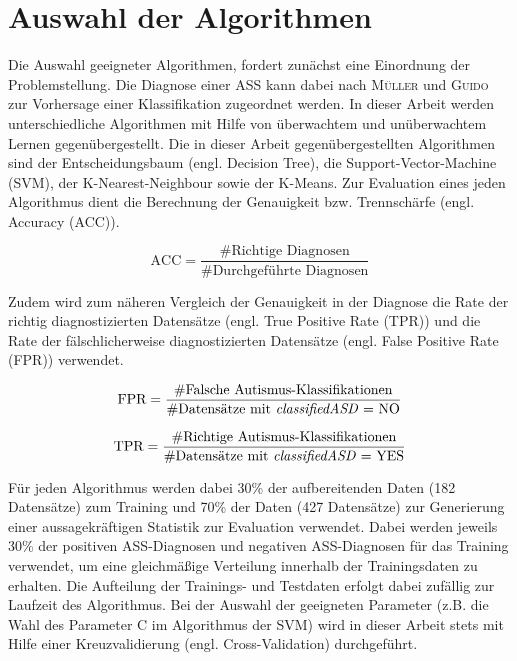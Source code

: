 \section{Auswahl der Algorithmen} \label{sec:algorithms}
Die Auswahl geeigneter Algorithmen, fordert zunächst eine Einordnung der Problemstellung. Die Diagnose einer ASS kann dabei nach \textsc{Müller} und \textsc{Guido} \cite[S.~94]{Muller2016} zur Vorhersage einer Klassifikation zugeordnet werden. In dieser Arbeit werden unterschiedliche Algorithmen mit Hilfe von überwachtem und unüberwachtem Lernen \cite[S.~93]{Muller2016} gegenübergestellt. 
Die in dieser Arbeit gegenübergestellten Algorithmen sind der Entscheidungsbaum (engl. \glqq Decision Tree\grqq), die Support-Vector-Machine (SVM), der K-Nearest-Neighbour sowie der K-Means. %
Zur Evaluation eines jeden Algorithmus dient die Berechnung der Genauigkeit bzw. Trennschärfe (engl. \glqq Accuracy\grqq{} (ACC)).

\begin{equation} \label{math:accuracy}
\text{ACC} = \frac{\#\text{Richtige Diagnosen}}{\#\text{Durchgeführte Diagnosen}}
\end{equation}

Zudem wird zum näheren Vergleich der Genauigkeit in der Diagnose die Rate der richtig diagnostizierten Datensätze (engl. \glqq True Positive Rate\grqq{} (TPR)) und die Rate der fälschlicherweise diagnostizierten Datensätze (engl. \glqq False Positive Rate\grqq{} (FPR)) verwendet.

\begin{equation} \label{math:fpr}
\text{FPR} = \frac{\#\text{Falsche Autismus-Klassifikationen}}{\#\text{Datensätze mit \textit{classifiedASD} = NO}}
\end{equation}

{\setlength{\parindent}{0cm}
\begin{equation} \label{math:tpr}
\text{TPR} = \frac{\#\text{Richtige Autismus-Klassifikationen}}{\#\text{Datensätze mit \textit{classifiedASD} = YES}}
\end{equation}}

Für jeden Algorithmus werden dabei 30\% der aufbereitenden  Daten (182 Datensätze) zum Training und 70\%  der Daten (427 Datensätze) zur Generierung einer aussagekräftigen Statistik zur Evaluation verwendet. Dabei werden jeweils 30\% der positiven ASS-Diagnosen und negativen ASS-Diagnosen für das Training verwendet, um eine gleichmäßige Verteilung innerhalb der Trainingsdaten zu erhalten. Die Aufteilung der Trainings- und Testdaten erfolgt dabei zufällig zur Laufzeit des Algorithmus. Bei der Auswahl der geeigneten Parameter (z.B. die Wahl des Parameter C im Algorithmus der SVM) wird in dieser Arbeit stets mit Hilfe einer Kreuzvalidierung (engl. \glqq Cross-Validation\grqq{}) durchgeführt.

